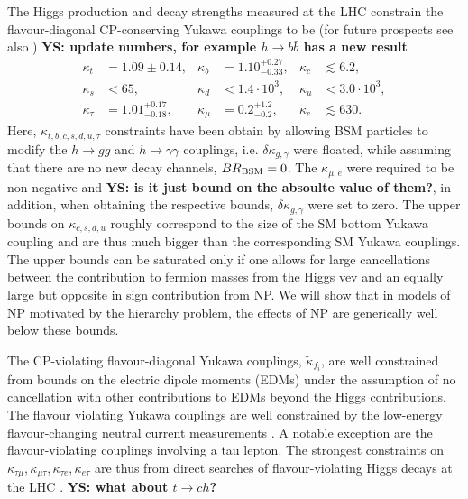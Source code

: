\documentclass[../report.tex]{subfiles}
\begin{document}
The Higgs production and decay strengths measured at the LHC constrain the flavour-diagonal CP-conserving Yukawa couplings to be \cite{CMS-PAS-HIG-15-002,CMS-PAS-HIG-17-031,Perez:2015aoa,Kagan:2014ila,Altmannshofer:2015qra} (for future prospects see also \cite{Perez:2015lra,Brivio:2015fxa,Koenig:2015pha,Aad:2015sda,Bodwin:2014bpa,Bodwin:2013gca})
{\bf YS: update numbers, for example $h\to b\bar{b}$ has a new result}
\begin{align}
\label{eq:kappalimits}
\kappa_t&=1.09\pm0.14, & \kappa_b&=1.10^{+0.27}_{-0.33},&\kappa_c&\lesssim 6.2,\nonumber\\
\kappa_s&< 65,  &\kappa_d&<1.4 \cdot 10^3, &\kappa_u&<3.0 \cdot 10^{3},\\
 \kappa_\tau&=1.01^{+0.17}_{-0.18},  &\kappa_\mu&=0.2^{+1.2}_{-0.2},  &\kappa_e& \lesssim 630.\nonumber
\end{align}
Here, $\kappa_{t,b,c,s,d,u,\tau}$ constraints have been obtain by
allowing BSM particles to modify the $h\to gg$ and $h\to \gamma\gamma$
couplings, i.e. $\delta\kappa_{g,\gamma}$ were floated, while assuming
that there are no new decay channels, $BR_{\rm BSM}=0$. The
$\kappa_{\mu,e}$ were required to be non-negative and {\bf YS: is it just bound on the absoulte value of them?}, in addition,
when obtaining the respective bounds, $\delta\kappa_{g,\gamma}$ were
set to zero.  The upper bounds on $\kappa_{c,s,d,u}$ roughly
correspond to the size of the SM bottom Yukawa coupling and are thus
much bigger than the corresponding SM Yukawa couplings. The upper bounds can be
saturated only if one allows for large cancellations between the
contribution to fermion masses from the Higgs vev and an equally large
but opposite in sign contribution from NP. We will show that in models
of NP motivated by the hierarchy problem, the effects of NP are
generically well below these bounds.

The CP-violating flavour-diagonal Yukawa couplings, $\tilde \kappa_{f_i}$,
are well constrained from bounds on the electric dipole moments (EDMs)
\cite{Brod:2013cka,Chien:2015xha,Altmannshofer:2015qra} under the assumption of no 
cancellation with other contributions to EDMs beyond the Higgs contributions. The flavour
violating Yukawa couplings are well constrained by the low-energy
flavour-changing neutral current measurements
\cite{Harnik:2012pb,Blankenburg:2012ex,Gorbahn:2014sha}. A notable
exception are the flavour-violating couplings involving a tau lepton. The
strongest constraints on $\kappa_{\tau\mu}, \kappa_{\mu\tau},
\kappa_{\tau e}, \kappa_{e \tau}$ are thus from direct searches of flavour-violating Higgs decays at
the LHC \cite{Sirunyan:2017xzt,Aad:2016blu}.
{\bf YS: what about $t\to ch$?}
\end{document}

